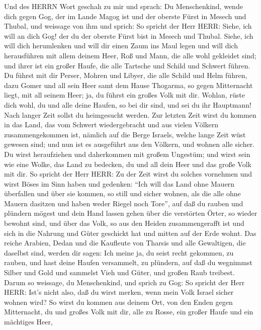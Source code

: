  Und des HERRN Wort geschah zu mir und sprach: 
Du Menschenkind, wende dich gegen Gog, der im Lande Magog ist und der
oberste Fürst in Mesech und Thubal, und weissage von ihm 
und sprich: So spricht der Herr HERR: Siehe, ich will an dich Gog! der
du der oberste Fürst bist in Mesech und Thubal.  Siehe, ich
will dich herumlenken und will dir einen Zaum ins Maul legen und will
dich herausführen mit allem deinem Heer, Roß und Mann, die alle wohl
gekleidet sind; und ihrer ist ein großer Haufe, die alle Tartsche und
Schild und Schwert führen.  Du führst mit dir Perser, Mohren
und Libyer, die alle Schild und Helm führen,  dazu Gomer und
all sein Heer samt dem Hause Thogarma, so gegen Mitternacht liegt, mit
all seinem Heer; ja, du führst ein großes Volk mit dir. 
Wohlan, rüste dich wohl, du und alle deine Haufen, so bei dir sind, und
sei du ihr Hauptmann!  Nach langer Zeit sollst du
heimgesucht werden. Zur letzten Zeit wirst du kommen in das Land, das
vom Schwert wiedergebracht und aus vielen Völkern zusammengekommen ist,
nämlich auf die Berge Israels, welche lange Zeit wüst gewesen sind; und
nun ist es ausgeführt aus den Völkern, und wohnen alle sicher.
 Du wirst heraufziehen und daherkommen mit großem Ungestüm;
und wirst sein wie eine Wolke, das Land zu bedecken, du und all dein
Heer und das große Volk mit dir.  So spricht der Herr HERR:
Zu der Zeit wirst du solches vornehmen und wirst Böses im Sinn haben
 und gedenken: ``Ich will das Land ohne Mauern überfallen
und über sie kommen, so still und sicher wohnen, als die alle ohne
Mauern dasitzen und haben weder Riegel noch Tore'',  auf
daß du rauben und plündern mögest und dein Hand lassen gehen über die
verstörten Örter, so wieder bewohnt sind, und über das Volk, so aus den
Heiden zusammengerafft ist und sich in die Nahrung und Güter geschickt
hat und mitten auf der Erde wohnt.  Das reiche Arabien,
Dedan und die Kaufleute von Tharsis und alle Gewaltigen, die daselbst
sind, werden dir sagen: Ich meine ja, du seist recht gekommen, zu
rauben, und hast deine Haufen versammelt, zu plündern, auf daß du
wegnimmst Silber und Gold und sammelst Vieh und Güter, und großen Raub
treibest.  Darum so weissage, du Menschenkind, und sprich
zu Gog: So spricht der Herr HERR: Ist's nicht also, daß du wirst merken,
wenn mein Volk Israel sicher wohnen wird?  So wirst du
kommen aus deinem Ort, von den Enden gegen Mitternacht, du und großes
Volk mit dir, alle zu Rosse, ein großer Haufe und ein mächtiges Heer,
